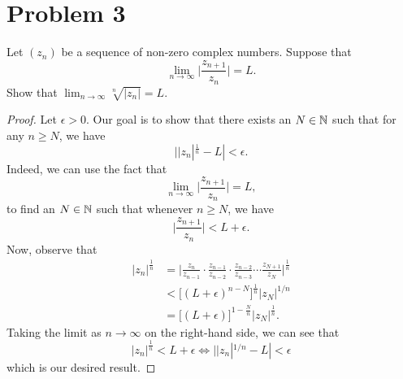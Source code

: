 \documentclass[a4paper]{article}
\begin{document}
\section*{Problem 3}
Let \( ({z}_{n}) \) be a sequence of non-zero complex numbers. Suppose that 
\[  \lim_{ n \to \infty  }  \Big| \frac{ {z}_{n+1}  }{ {z}_{n} }  \Big|  = L. \]
Show that \( \lim_{ n \to \infty  } \sqrt[n]{ | {z}_{n} |   }  = L  \).

\begin{proof}
Let \( \epsilon > 0  \). Our goal is to show that there exists an \( N \in \mathbb{N}  \) such that for any \( n \geq N  \), we have
\[ | | {z}_{n} |^{\frac{ 1 }{ n } } - L  | < \epsilon.  \]
Indeed, we can use the fact that 
\[  \lim_{ n \to \infty  }  \Big| \frac{ {z}_{n+1} }{ {z}_{n} }  \Big|  = L,  \]
to find an \( N \in \mathbb{N}  \) such that whenever \(  n \geq  N \), we have
\[  \Big| \frac{ {z}_{n+1} }{ {z}_{n} }  \Big| < L + \epsilon.  \]
Now, observe that
\begin{align*}
    | {z}_{n} |^{\frac{ 1 }{ n } } &= \Big| \frac{ {z}_{n} }{ {z}_{n-1} } \cdot \frac{ {z}_{n-1} }{ {z}_{n-2} } \cdot \frac{ {z}_{n-2} }{ {z}_{n-3} } \cdots \frac{ {z}_{N+1} }{ {z}_{N} }  \Big|^{\frac{ 1 }{ n } } \\ 
                                   &< \Big[ (L+\epsilon)^{n - N} \Big]^{\frac{ 1 }{ n }} | {z}_{N} |^{1/n} \\
                                   &= \Big[(L+\epsilon)\Big]^{1- \frac{ N }{ n } } | {z}_{N} |^{\frac{ 1 }{ n }}.
\end{align*}
Taking the limit as \( n \to \infty  \) on the right-hand side, we can see that
\[  | {z}_{n} |^{\frac{ 1 }{ n }} < L + \epsilon \Longleftrightarrow  | | {z}_{n} |^{1/n} - L | < \epsilon     \]
which is our desired result.

\end{proof}
\end{document}
